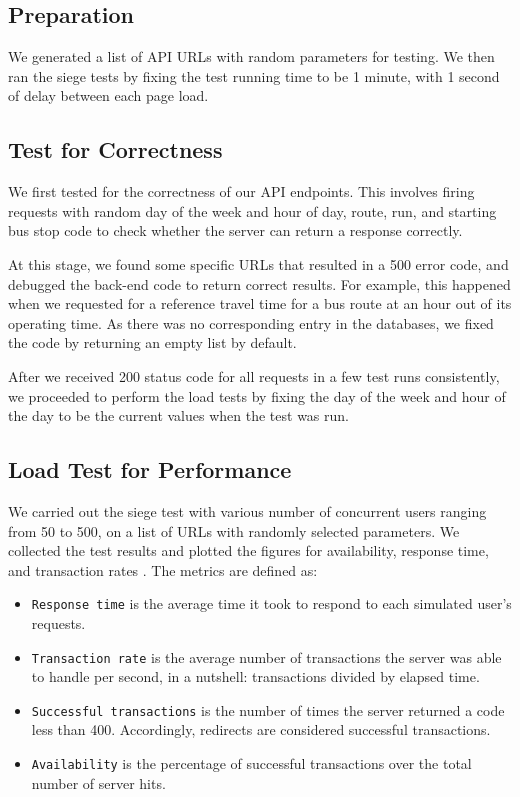 \subsection{Preparation}
\par We generated a list of API URLs with random parameters for testing. We then ran the siege tests by fixing the test running time to be 1 minute, with 1 second of delay between each page load.

\subsection{Test for Correctness}
\par We first tested for the correctness of our API endpoints. This involves firing requests with random day of the week and hour of day, route, run, and starting bus stop code to check whether the server can return a response correctly.

\par At this stage, we found some specific URLs that resulted in a 500 error code, and debugged the back-end code to return correct results. For example, this happened when we requested for a reference travel time for a bus route at an hour out of its operating time. As there was no corresponding entry in the databases, we fixed the code by returning an empty list by default.

\par After we received 200 status code for all requests in a few test runs consistently, we proceeded to perform the load tests by fixing the day of the week and hour of the day to be the current values when the test was run.

\subsection{Load Test for Performance}
\par We carried out the siege test with various number of concurrent users ranging from 50 to 500, on a list of URLs with randomly selected parameters. We collected the test results and plotted the figures for availability, response time, and transaction rates \cite{siege_manual}. The metrics are defined as:

\begin{itemize}
  \item \texttt{Response time} is the average time it took to respond to each simulated user’s requests.

  \item \texttt{Transaction rate} is the average number of transactions the server was able to handle per second, in a nutshell: transactions divided by elapsed time.

  \item \texttt{Successful transactions} is the number of times the server returned a code less than 400. Accordingly, redirects are considered successful transactions.

  \item \texttt{Availability} is the percentage of successful transactions over the total number of server hits.
\end{itemize}


